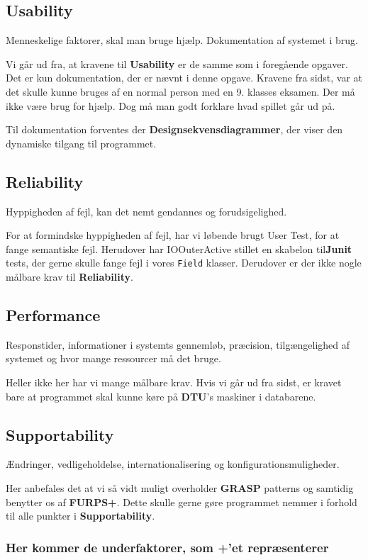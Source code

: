 \subsection{Usability}
Menneskelige faktorer, skal man bruge hjælp. Dokumentation af systemet i brug.

Vi går ud fra, at kravene til \textbf{Usability} er de samme som i foregående opgaver. Det er kun dokumentation, der er nævnt i denne opgave. Kravene fra sidst, var at det skulle kunne bruges af en normal person med en 9. klasses eksamen. Der må ikke være brug for hjælp. Dog må man godt forklare hvad spillet går ud på.

Til dokumentation forventes der \textbf{Designsekvensdiagrammer}, der viser den dynamiske tilgang til programmet.
\subsection{Reliability}
Hyppigheden af fejl, kan det nemt gendannes og forudsigelighed.

For at formindske hyppigheden af fejl, har vi løbende brugt User Test, for at fange semantiske fejl. Herudover har IOOuterActive stillet en skabelon til\textbf{Junit} tests, der gerne skulle fange fejl i vores \texttt{Field} klasser. Derudover er der ikke nogle målbare krav til \textbf{Reliability}.
\subsection{Performance}
Responstider, informationer i systemts gennemløb, præcision, tilgængelighed af systemet og hvor mange ressourcer må det bruge.

Heller ikke her har vi mange målbare krav. Hvis vi går ud fra sidst, er kravet bare at programmet skal kunne køre på \textbf{DTU}'s maskiner i databarene.
\subsection{Supportability}
Ændringer, vedligeholdelse, internationalisering og konfigurationsmuligheder.

Her anbefales det at vi så vidt muligt overholder \textbf{GRASP} patterns og samtidig benytter os af \textbf{FURPS+}. Dette skulle gerne gøre programmet nemmer i forhold til alle punkter i \textbf{Supportability}.
\subsubsection*{Her kommer de underfaktorer, som +'et repræsenterer}
